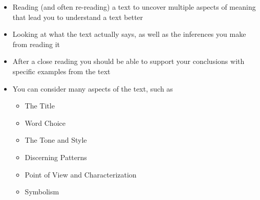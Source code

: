 \documentclass[a4paper,landscape,headrule,footrule,xetex]{foils}
\begin{document}

\begin{itemize}
\item Reading (and often re-reading) a text to uncover multiple
  aspects of meaning that lead you to understand a text better
\item Looking at what the text actually says, as well as the
  inferences you make from reading it
\item After a close reading you should be able to support your
  conclusions with specific examples from the text
\item You can consider many aspects of the text, such as
  \begin{itemize}
  \item The Title
  \item Word Choice
  \item The Tone and Style
  \item Discerning Patterns
  \item  Point of View and Characterization
  \item Symbolism

  \end{itemize}
  \end{itemize}
\end{document}

